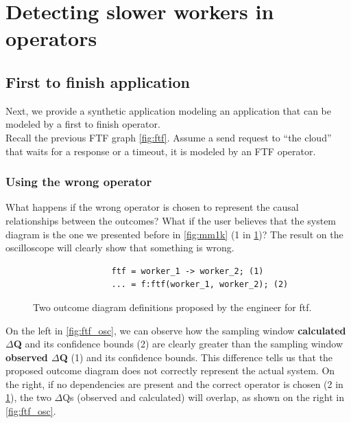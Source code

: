 \section{Detecting slower workers in operators}
    \subsection{First to finish application}
        Next, we provide a synthetic application modeling an application that can be modeled by a first to finish operator. \\
        Recall the previous FTF graph \cref{fig:ftf}. Assume a send request to ``the cloud'' that waits for a response or a timeout, it is modeled by an FTF operator. \cite{dq-tut}
       \subsubsection{Using the wrong operator}
            What happens if the wrong operator is chosen to represent the causal relationships between the outcomes? What if the user believes that the system diagram is the one we presented before in \cref{fig:mm1k} (1 in \cref{code:wrong_od})? The result on the oscilloscope will clearly show that something is wrong.
            \begin{figure}[H]
            \begin{verbatim}
                ftf = worker_1 -> worker_2; (1)
                ... = f:ftf(worker_1, worker_2); (2)
            \end{verbatim}
            \caption{Two outcome diagram definitions proposed by the engineer for ftf.}
                \label{code:wrong_od}
            \end{figure}

            On the left in \cref{fig:ftf_osc}, we can observe how the sampling window \textbf{calculated $\Delta$Q} and its confidence bounds (2) are clearly greater than the sampling window \textbf{observed $\Delta$Q} (1) and its confidence bounds. This difference tells us that the proposed outcome diagram does not correctly represent the actual system. On the right, if no dependencies are present and the correct operator is chosen (2 in \cref{code:wrong_od}), the two $\Delta$Qs (observed and calculated) will overlap, as shown on the right in \cref{fig:ftf_osc}.

